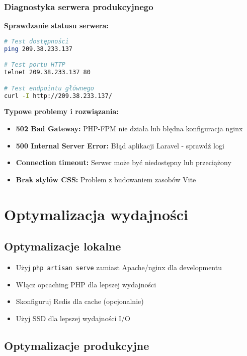 \documentclass[12pt,a4paper]{article}
\begin{document}
    \subsubsection{Diagnostyka serwera produkcyjnego}

    \textbf{Sprawdzanie statusu serwera:}
    \begin{lstlisting}[language=bash]
# Test dostępności
ping 209.38.233.137

# Test portu HTTP
telnet 209.38.233.137 80

# Test endpointu głównego
curl -I http://209.38.233.137/
    \end{lstlisting}

    \textbf{Typowe problemy i rozwiązania:}
    \begin{itemize}
        \item \textbf{502 Bad Gateway:} PHP-FPM nie działa lub błędna konfiguracja nginx
        \item \textbf{500 Internal Server Error:} Błąd aplikacji Laravel - sprawdź logi
        \item \textbf{Connection timeout:} Serwer może być niedostępny lub przeciążony
        \item \textbf{Brak stylów CSS:} Problem z budowaniem zasobów Vite
    \end{itemize}

    \section{Optymalizacja wydajności}

    \subsection{Optymalizacje lokalne}

    \begin{itemize}
        \item Użyj \texttt{php artisan serve} zamiast Apache/nginx dla developmentu
        \item Włącz opcaching PHP dla lepszej wydajności
        \item Skonfiguruj Redis dla cache (opcjonalnie)
        \item Użyj SSD dla lepszej wydajności I/O
    \end{itemize}

    \subsection{Optymalizacje produkcyjne}
\end{document}

